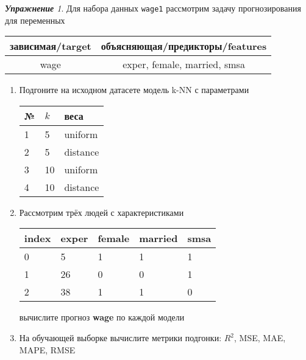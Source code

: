 \documentclass[a4,12pt]{article}
\theoremstyle{remark}
\newtheorem{exercise}{\textbf{Упражнение}}[section]
\begin{document}
\begin{exercise}
Для набора данных \texttt{wage1} рассмотрим задачу прогнозирования
для переменных
\begin{center}
	\begin{tabular}{|c|c|}\hline
		зависимая/target & объясняющая/предикторы/features \\ \hline
		wage & exper, female, married, smsa \\ \hline
	\end{tabular}
\end{center}
\begin{enumerate}
	\item Подгоните на исходном датасете модель k-NN с параметрами
	\begin{center}
		\begin{tabular}{|l|l|l|}\hline
		№ & \(k\) & веса \\ \hline
		1 & 5 & uniform \\
		2 & 5 & distance \\
		3 & 10 & uniform \\
		4 & 10 & distance \\ \hline
		\end{tabular}
	\end{center}
	\item Рассмотрим трёх людей с характеристиками
	\begin{center}
		\begin{tabular}{|l||l|l|l|l|}\hline
			index & exper & female & married & smsa \\ \hline\hline
			0 & 5 & 1 & 1 & 1  \\
			1 & 26 & 0 & 0 & 1 \\
			2 & 38 & 1 & 1 & 0 \\ \hline
		\end{tabular}
	\end{center}
	вычислите прогноз \textbf{wage} по каждой модели

	\item На обучающей выборке вычислите метрики подгонки: \(R^2\), 
	MSE, MAE, MAPE, RMSE
\end{enumerate}
\end{exercise}
\end{document}
